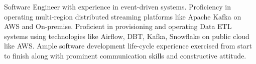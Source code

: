 

\begin{cvparagraph}

Software Engineer with experience in event-driven systems. Proficiency in operating multi-region distributed streaming platforms like Apache Kafka on AWS and On-premise. Proficient in provisioning and operating Data ETL systems using technologies  like Airflow, DBT, Kafka, Snowflake on public cloud like AWS. Ample software development life-cycle experience exercised from start to finish along with prominent communication skills and constructive attitude.
\end{cvparagraph}

